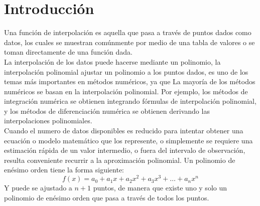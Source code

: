 \documentclass[12pt]{article}
\begin{document}
		\section*{\centering Introducción}\label{sec:Introducción}
			Una función de interpolación es aquella que pasa a través de puntos dados como datos, los cuales 
			se muestran comúnmente por medio de una tabla de valores o se toman directamente de una función 
			dada. \\
			La interpolación de los datos puede hacerse mediante un polinomio, la interpolación polinomial 
			ajustar un polinomio a los puntos dados, es uno de los temas más importantes en métodos numéricos, 
			ya que La mayoría de los métodos numéricos se basan en la interpolación polinomial. Por ejemplo, 
			los métodos de integración numérica se obtienen integrando fórmulas de interpolación polinomial, 
			y los métodos de diferenciación numérica se obtienen derivando las interpolaciones polinomiales. \cite{bib:item1} \\
			Cuando el numero de datos disponibles es reducido para intentar obtener una ecuación o modelo 
			matemático que los represente, o simplemente se requiere una estimación rápida de un valor 
			intermedio, o fuera del intervalo de observación, resulta conveniente recurrir a la aproximación 
			polinomial. Un polinomio de enésimo orden tiene la forma siguiente:
			$$ f(x) = a_0 + a_1x + a_2x^2 + a_3x^3 + \dots + a_nx^n $$
			Y puede se ajustado a $ n+1 $ puntos, de manera que existe uno y solo un polinomio de enésimo orden 
			que pasa a través de todos los puntos. \cite{bib:item2}
		
\end{document}
